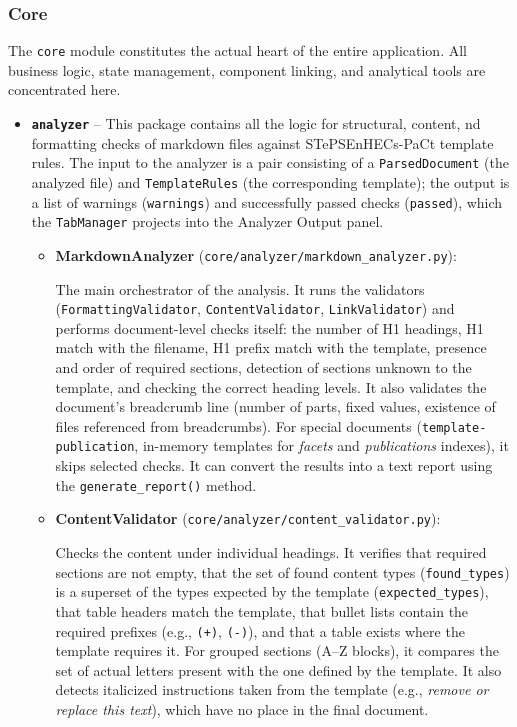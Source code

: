 \documentclass[12pt, a4paper]{article}
\begin{document}
\subsubsection{Core}

The \texttt{core} module constitutes the actual heart of the entire application. All business logic, 
state management, component linking, and analytical tools are concentrated here.

\begin{itemize}

    \item \textbf{\texttt{analyzer}} -- This package contains all the logic for structural, content, 
    nd formatting checks of markdown files against STePSEnHECs-PaCt template rules. The input to the 
    analyzer is a pair consisting of a \texttt{ParsedDocument} (the analyzed file) and \texttt{TemplateRules} 
    (the corresponding template); the output is a list of warnings (\texttt{warnings}) and successfully 
    passed checks (\texttt{passed}), which the \texttt{TabManager} projects into the Analyzer Output panel.
    
    \begin{itemize}
        \item \textbf{MarkdownAnalyzer} (\texttt{core/analyzer/markdown\_analyzer.py}):

        The main orchestrator of the analysis. It runs the validators (\texttt{FormattingValidator}, 
        \texttt{ContentValidator}, \texttt{LinkValidator}) and performs document-level checks itself: 
        the number of H1 headings, H1 match with the filename, H1 prefix match with the template, 
        presence and order of required sections, detection of sections unknown to the template, and 
        checking the correct heading levels. It also validates the document's breadcrumb line (number 
        of parts, fixed values, existence of files referenced from breadcrumbs). For special documents 
        (\texttt{template-publication}, in-memory templates for \emph{facets} and \emph{publications} indexes), 
        it skips selected checks. It can convert the results into a text report using the \texttt{generate\_report()} method.

        \item \textbf{ContentValidator} (\texttt{core/analyzer/content\_validator.py}):

        Checks the content under individual headings. It verifies that required sections are not empty, 
        that the set of found content types (\texttt{found\_types}) is a superset of the types expected 
        by the template (\texttt{expected\_types}), that table headers match the template, that bullet 
        lists contain the required prefixes (e.g., \texttt{(+)}, \texttt{(-)}), and that a table exists 
        where the template requires it. For grouped sections (A--Z blocks), it compares the set of actual 
        letters present with the one defined by the template. It also detects italicized instructions taken 
        from the template (e.g., \emph{remove or replace this text}), which have no place in the final document.


\end{itemize}
\end{itemize}
\end{document}
